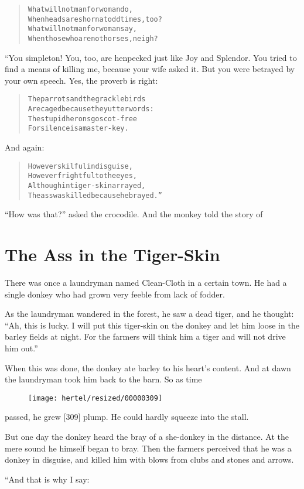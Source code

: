 \documentclass[article, twoside, 10pt]{memoir}
\renewenvironment{verbatim}{%
\begin{quote}%
\vskip -10pt%
\begin{alltt}\normalfont\small}{\end{alltt}%
\end{quote}%
\vskip -10pt
} %
\begin{document}
\begin{verbatim}
What will not man for woman do,
When heads are shorn{\textemdash}at odd times, too?
What will not man for woman say,
When those who are not horses, neigh?
\end{verbatim}
“You simpleton! You, too, are henpecked just like Joy and Splendor.
You tried to find a means of killing me, because your wife asked
it. But you were betrayed by your own speech. Yes, the proverb is
right:

\begin{verbatim}
The parrots and the grackle birds
Are caged because they utter words:
The stupid herons go scot-free{\textemdash}
For silence is a master-key.
\end{verbatim}
And again:

\begin{verbatim}
However skilful in disguise,
However frightful to the eyes,
Although in tiger-skin arrayed,
The ass was killed{\textemdash}because he brayed.”
\end{verbatim}
``How was that?'' asked the crocodile. And the monkey told the
story of

\chapter{The Ass in the Tiger-Skin}

There was once a laundryman named Clean-Cloth in a certain town. He
had a single donkey who had grown very feeble from lack of fodder.

As the laundryman wandered in the forest, he saw a dead tiger, and
he thought:
``Ah, this is lucky. I will put this tiger-skin on the donkey and let him loose in the barley fields at night. For the farmers will think him a tiger and will not drive him out.''

When this was done, the donkey ate barley to his heart's content.
And at dawn the laundryman took him back to the barn. So as time
\begin{figure}[p]\texttt{[image: hertel/resized/00000309]}\end{figure}passed, he grew [309] plump. He could hardly squeeze into the
stall.

But one day the donkey heard the bray of a she-donkey in the
distance. At the mere sound he himself began to bray. Then the
farmers perceived that he was a donkey in disguise, and killed him
with blows from clubs and stones and arrows.

“And that is why I say:
\end{document}
